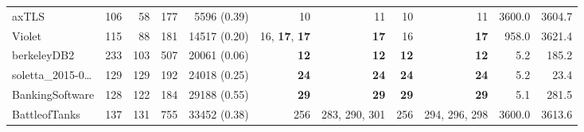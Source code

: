 \begin{table*}
\begin{tiny}
{\begin{tabular}{lrrrrrrrrrr}
axTLS & \num[text-series-to-math=true]{106} & \num[text-series-to-math=true]{58} & \num[text-series-to-math=true]{177} & \num[text-series-to-math=true]{5596} (\num[text-series-to-math=true]{0.39}) & \num[text-series-to-math=true]{10} & \num[text-series-to-math=true]{11} & \num[text-series-to-math=true]{10} & \num[text-series-to-math=true]{11} & 3600.0 & 3604.7\\
Violet & \num[text-series-to-math=true]{115} & \num[text-series-to-math=true]{88} & \num[text-series-to-math=true]{181} & \num[text-series-to-math=true]{14517} (\num[text-series-to-math=true]{0.20}) & \num[text-series-to-math=true]{16}, \textbf{\num[text-series-to-math=true]{17}}, \textbf{\num[text-series-to-math=true]{17}} & \textbf{\num[text-series-to-math=true]{17}} & \num[text-series-to-math=true]{16} & \textbf{\num[text-series-to-math=true]{17}} & 958.0 & 3621.4\\
berkeleyDB2 & \num[text-series-to-math=true]{233} & \num[text-series-to-math=true]{103} & \num[text-series-to-math=true]{507} & \num[text-series-to-math=true]{20061} (\num[text-series-to-math=true]{0.06}) & \textbf{\num[text-series-to-math=true]{12}} & \textbf{\num[text-series-to-math=true]{12}} & \textbf{\num[text-series-to-math=true]{12}} & \textbf{\num[text-series-to-math=true]{12}} & 5.2 & 185.2\\
soletta\_2015-0\ldots & \num[text-series-to-math=true]{129} & \num[text-series-to-math=true]{129} & \num[text-series-to-math=true]{192} & \num[text-series-to-math=true]{24018} (\num[text-series-to-math=true]{0.25}) & \textbf{\num[text-series-to-math=true]{24}} & \textbf{\num[text-series-to-math=true]{24}} & \textbf{\num[text-series-to-math=true]{24}} & \textbf{\num[text-series-to-math=true]{24}} & 5.2 & 23.4\\
BankingSoftware & \num[text-series-to-math=true]{128} & \num[text-series-to-math=true]{122} & \num[text-series-to-math=true]{184} & \num[text-series-to-math=true]{29188} (\num[text-series-to-math=true]{0.55}) & \textbf{\num[text-series-to-math=true]{29}} & \textbf{\num[text-series-to-math=true]{29}} & \textbf{\num[text-series-to-math=true]{29}} & \textbf{\num[text-series-to-math=true]{29}} & 5.1 & 281.5\\
BattleofTanks & \num[text-series-to-math=true]{137} & \num[text-series-to-math=true]{131} & \num[text-series-to-math=true]{755} & \num[text-series-to-math=true]{33452} (\num[text-series-to-math=true]{0.38}) & \num[text-series-to-math=true]{256} & \num[text-series-to-math=true]{283}, \num[text-series-to-math=true]{290}, \num[text-series-to-math=true]{301} & \num[text-series-to-math=true]{256} & \num[text-series-to-math=true]{294}, \num[text-series-to-math=true]{296}, \num[text-series-to-math=true]{298} & 3600.0 & 3613.6\\

\end{tabular}}
\end{tiny}
\end{table*}

